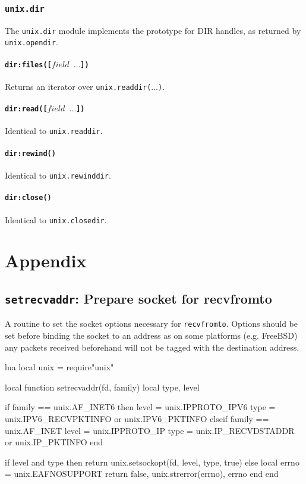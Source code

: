 \documentclass[11pt, oneside]{memoir}
\newcommand*{\fn}[1]{\texttt{#1}\xspace}
\newcommand*{\module}[1]{\texttt{#1}\xspace}
\newcounter{toccols}
\newenvironment{Module}[1]{
	\subsection{\texttt{#1}}
	\addtocontents{toc}{
		\protect\begin{multicols}{\value{toccols}}
	}
}{
	\addtocontents{toc}{\protect\end{multicols}}
}
\begin{document}
\begin{Module}{unix.dir}

The \module{unix.dir} module implements the prototype for DIR handles, as returned by \fn{unix.opendir}.

\subsubsection[\fn{dir:files}]{\fn{dir:files([$field$ $\ldots$])}}

Returns an iterator over \fn{unix.readdir($\ldots$)}.

\subsubsection[\fn{dir:read}]{\fn{dir:read([$field$ $\ldots$])}}

Identical to \fn{unix.readdir}.

\subsubsection[\fn{dir:rewind}]{\fn{dir:rewind()}}

Identical to \fn{unix.rewinddir}.

\subsubsection[\fn{dir:close}]{\fn{dir:close()}}

Identical to \fn{unix.closedir}.

\end{Module}

\chapter{Appendix}

\section[\fn{setrecvaddr}]{\fn{setrecvaddr}: Prepare socket for recvfromto}

\label{setrecvaddr}

A routine to set the socket options necessary for \fn{recvfromto}. Options should be set before binding the socket to an address as on some platforms (e.g. FreeBSD) any packets received beforehand will not be tagged with the destination address.

\begin{example}{lua}
local unix = require"unix"

local function setrecvaddr(fd, family)
  local type, level

  if family == unix.AF_INET6 then
    level = unix.IPPROTO_IPV6
    type = unix.IPV6_RECVPKTINFO or unix.IPV6_PKTINFO
  elseif family == unix.AF_INET
    level = unix.IPPROTO_IP
    type = unix.IP_RECVDSTADDR or unix.IP_PKTINFO
  end

  if level and type then
    return unix.setsockopt(fd, level, type, true)
  else
    local errno = unix.EAFNOSUPPORT
    return false, unix.strerror(errno), errno
  end
end
\end{example}
\end{document}
